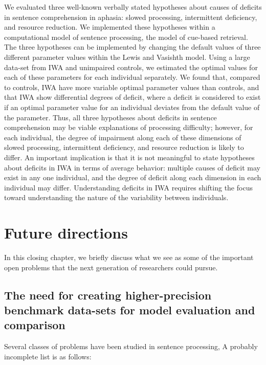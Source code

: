 \documentclass{cambridge7A}\usepackage[]{graphicx}\usepackage[]{color}
\begin{document}
We evaluated three well-known verbally stated hypotheses about causes of deficits in  sentence comprehension in aphasia: slowed processing, intermittent deficiency, and resource reduction. We implemented these hypotheses within a computational model of sentence processing, the \cite{LewisVasishth2005} model of cue-based retrieval. The three hypotheses can be implemented by changing the default values of three different parameter values within the Lewis and Vasishth model. Using a large data-set from IWA and unimpaired controls, 
we estimated the optimal values for each of these parameters for each individual separately. We found that, compared to controls, IWA have more variable optimal parameter values than controls, and that IWA show differential degrees of deficit, where a deficit is considered to exist if an optimal parameter value for an individual  deviates from the default value of the parameter. Thus, all three hypotheses about deficits in sentence comprehension may be viable explanations of processing difficulty; however, for each individual, the degree of impairment along each of these dimensions of slowed processing, intermittent deficiency, and resource reduction is likely to differ. An important implication is that it is not meaningful to state hypotheses about deficits in IWA  in terms of average behavior: multiple causes of deficit may exist in any one individual, and the degree of deficit along each dimension in each individual may differ. Understanding deficits in IWA requires shifting the focus toward understanding the nature of the variability between individuals.



\chapter{Future directions} \label{c09}

In this closing chapter, we briefly discuss what we see as some of the important open problems that the next generation of researchers could pursue.

\section{The need for creating higher-precision benchmark data-sets for model evaluation and comparison}

Several classes of problems have been studied in sentence processing, A probably incomplete list is as follows:
\end{document}
